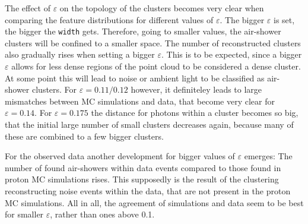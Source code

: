The effect of $\varepsilon$ on the topology of the clusters becomes very clear
when comparing the feature distributions for different values of $\varepsilon$.
The bigger $\varepsilon$ is set, the bigger the \texttt{width} gets. Therefore,
going to smaller values, the air-shower clusters will be confined to a smaller
space. The number of reconstructed clusters also gradually rises when setting
a bigger $\varepsilon$. This is to be expected, since a bigger $\varepsilon$
allows for less dense regions of the point cloud to be considered a dense
cluster. At some point this will lead to noise or ambient light to be
classified as air-shower clusters. For $\varepsilon = 0.11 / 0.12$ however, it
definiteley leads to large mismatches between MC simulations and data, that
become very clear for $\varepsilon = 0.14$. For $\varepsilon = 0.175$ the
distance for photons within a cluster becomes so big, that the initial large
number of small clusters decreases again, because many of these are combined to
a few bigger clusters.

For the observed data another development for bigger values of $\varepsilon$
emerges: The number of found air-showers within data events compared to those
found in proton MC simulations rises. This supposedly is the result of the
clustering reconstructing noise events within the data, that are not present in
the proton MC simulations. All in all, the agreement of simulations and data
seem to be best for smaller $\varepsilon$, rather than ones above \num{0.1}.

